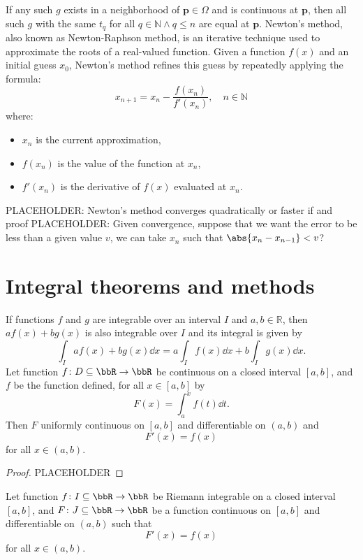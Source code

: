 \documentclass[a4paper,12pt]{report}
\begin{document}
\begin{itemize}
\begin{itemize}
If any such $g$ exists in a neighborhood of $\mathbf{p}\in\Omega$ and is continuous at $\mathbf{p}$, then all such $g$ with the same $t_q$ for all $q\in\mathbb{N}\land q\leq n$ are equal at $\mathbf{p}$.
Newton's method, also known as Newton-Raphson method, is an iterative technique used to approximate the roots of a real-valued function. Given a function $f(x)$ and an initial guess \( x_0 \), Newton's method refines this guess by repeatedly applying the formula:
\[
x_{n+1} = x_n - \frac{f(x_n)}{f'(x_n)},\quad n\in\mathbb{N}
\]
where:
\begin{itemize}
\item \( x_n \) is the current approximation,
\item \( f(x_n) \) is the value of the function at \( x_n \),
\item \( f'(x_n) \) is the derivative of \( f(x) \) evaluated at \( x_n \).
\end{itemize}
PLACEHOLDER: Newton's method converges quadratically or faster if and proof
PLACEHOLDER: Given convergence, suppose that we want the error to be less than a given value $v$, we can take $x_n$ such that $\abs{x_n-x_{n-1}}<v$?



\section{Integral theorems and methods}
If functions $f$ and $g$ are integrable over an interval $I$ and $a,b\in\mathbb{R}$, then $af(x)+bg(x)$ is also integrable over $I$ and its integral is given by
\[\int_Iaf(x)+bg(x)\dd{x}=a\int_If(x)\dd{x}+b\int_Ig(x)\dd{x}.\]
Let function $f\colon D\subseteq\bbR\to\bbR$ be continuous on a closed interval $[a,b]$, and $f$ be the function defined, for all $x\in[a,b]$ by
\[F(x)=\int_a^xf(t)\dd{t}.\]
Then $F$ uniformly continuous on $[a,b]$ and differentiable on $(a,b)$ and
\[F'(x)=f(x)\]
for all $x\in (a,b)$.
\begin{proof}
PLACEHOLDER
\end{proof}
Let function $f\colon I\subseteq\bbR\to\bbR$ be Riemann integrable on a closed interval $[a,b]$, and $F\colon J\subseteq\bbR\to\bbR$ be a function continuous on $[a,b]$ and differentiable on $(a,b)$ such that
\[F'(x)=f(x)\]
for all $x\in (a,b)$.


\end{itemize}
\end{itemize}
\end{document}
